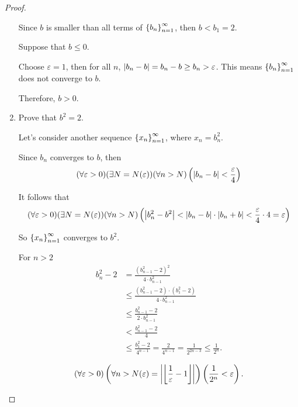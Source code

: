 \begin{proof}
\begin{enumerate}[label={\textbf{Step \arabic*.}},itemindent=1cm]
              Since $b$ is smaller than all terms of ${\left\{{b_{n}}\right\}}^{\infty}_{n=1}$, then $b < b_{1} = 2$.

              Suppose that $b\le 0$.

              Choose $\varepsilon = 1$, then for all $n$, $\left\vert{b_{n} - b}\right\vert = b_{n} - b \ge b_{n} > \varepsilon$. This means ${\left\{{b_{n}}\right\}}^{\infty}_{n=1}$ does not converge to $b$.

              Therefore, $b > 0$.
        \item Prove that ${b}^{2} = 2$.

              Let's consider another sequence ${\left\{{x_{n}}\right\}}^{\infty}_{n=1}$, where $x_{n} = {b^{2}_{n}}$.

              Since $b_{n}$ converges to $b$, then
              \[
                  (\forall\varepsilon > 0)(\exists N=N(\varepsilon))(\forall n > N)\left(\left\vert{b_{n} - b}\right\vert < \frac{\varepsilon}{4}\right)
              \]

              It follows that
              \[
                  (\forall\varepsilon > 0)(\exists N=N(\varepsilon))(\forall n > N)\left(\left\vert{b^{2}_{n} - b^{2}}\right\vert < \left\vert{b_{n} - b}\right\vert\cdot\left\vert{b_{n} + b}\right\vert < \frac{\varepsilon}{4}\cdot 4 = \varepsilon \right)
              \]

              So ${\left\{{x_{n}}\right\}}^{\infty}_{n=1}$ converges to $b^{2}$.

              For $n > 2$
              \begin{align*}
                  b_{n}^{2} - 2 & = \frac{{\left( b^{2}_{n-1} - 2 \right)}^{2}}{4\cdot b^{2}_{n-1}}                               \\
                                & \le \frac{(b^{2}_{n-1} - 2)\cdot (b^{2}_{1} - 2)}{4\cdot b^{2}_{n-1}}                           \\
                                & \le \frac{b^{2}_{n-1} - 2}{2\cdot b^{2}_{n-1}}                                                  \\
                                & < \frac{b^{2}_{n-1} - 2}{4}                                                                     \\
                                & \le \frac{b^{2}_{1} - 2}{4^{n-1}} = \frac{2}{4^{n-1}} = \frac{1}{2^{2n-3}} \le \frac{1}{2^{n}}.
              \end{align*}

              \[
                  (\forall\varepsilon > 0)\left(\forall n > N(\varepsilon) = \left\vert{\left\lfloor{\frac{1}{\varepsilon} - 1}\right\rfloor}\right\vert\right)\left( \frac{1}{2^{n}} < \varepsilon \right).
              \]


\end{enumerate}
\end{proof}
